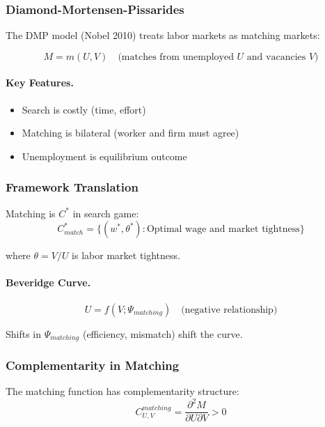 \subsubsection{Diamond-Mortensen-Pissarides}

The DMP model (Nobel 2010) treats labor markets as matching markets:

\begin{equation}
\boxed{
M = m(U, V) \quad \text{(matches from unemployed } U \text{ and vacancies } V\text{)}
}
\label{eq:dmp}
\end{equation}

\paragraph{Key Features.}
\begin{itemize}
    \item Search is costly (time, effort)
    \item Matching is bilateral (worker and firm must agree)
    \item Unemployment is equilibrium outcome
\end{itemize}

\subsubsection{Framework Translation}

Matching is $C^*$ in search game:
\begin{equation}
C^*_{match} = \{(w^*, \theta^*) : \text{Optimal wage and market tightness}\}
\end{equation}

where $\theta = V/U$ is labor market tightness.

\paragraph{Beveridge Curve.}
\begin{equation}
U = f(V; \Psi_{matching}) \quad \text{(negative relationship)}
\end{equation}

Shifts in $\Psi_{matching}$ (efficiency, mismatch) shift the curve.

\subsubsection{Complementarity in Matching}

The matching function has complementarity structure:
\begin{equation}
C_{U,V}^{matching} = \frac{\partial^2 M}{\partial U \partial V} > 0
\end{equation}

